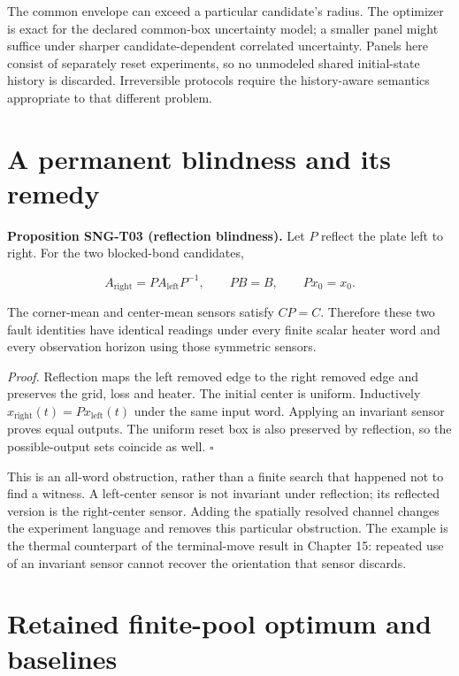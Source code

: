 \documentclass[
  11pt,
  a4paper,
]{report}
\begin{document}
The common envelope can exceed a particular candidate's radius. The
optimizer is exact for the declared common-box uncertainty model; a
smaller panel might suffice under sharper candidate-dependent correlated
uncertainty. Panels here consist of separately reset experiments, so no
unmodeled shared initial-state history is discarded. Irreversible
protocols require the history-aware semantics appropriate to that
different problem.

\hypertarget{a-permanent-blindness-and-its-remedy}{%
\section{A permanent blindness and its
remedy}\label{a-permanent-blindness-and-its-remedy}}

\textbf{Proposition SNG-T03 (reflection blindness).} Let \(P\) reflect
the plate left to right. For the two blocked-bond candidates,

\[
A_{\mathrm{right}}=PA_{\mathrm{left}}P^{-1},\qquad
PB=B,\qquad Px_0=x_0.
\]

The corner-mean and center-mean sensors satisfy \(CP=C\). Therefore
these two fault identities have identical readings under every finite
scalar heater word and every observation horizon using those symmetric
sensors.

\emph{Proof.} Reflection maps the left removed edge to the right removed
edge and preserves the grid, loss and heater. The initial center is
uniform. Inductively \(x_{\mathrm{right}}(t)=Px_{\mathrm{left}}(t)\)
under the same input word. Applying an invariant sensor proves equal
outputs. The uniform reset box is also preserved by reflection, so the
possible-output sets coincide as well. \(\square\)

This is an all-word obstruction, rather than a finite search that
happened not to find a witness. A left-center sensor is not invariant
under reflection; its reflected version is the right-center sensor.
Adding the spatially resolved channel changes the experiment language
and removes this particular obstruction. The example is the thermal
counterpart of the terminal-move result in Chapter 15: repeated use of
an invariant sensor cannot recover the orientation that sensor discards.

\hypertarget{retained-finite-pool-optimum-and-baselines}{%
\section{Retained finite-pool optimum and
baselines}\label{retained-finite-pool-optimum-and-baselines}}
\end{document}
